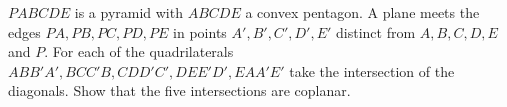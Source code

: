 $PABCDE$ is a pyramid with $ABCDE$ a convex pentagon. A plane meets the edges $PA,\allowbreak PB,\allowbreak PC,\allowbreak PD,\allowbreak PE$ in points $A',\allowbreak B',\allowbreak C',\allowbreak D',\allowbreak E'$ distinct from $A,\allowbreak B,\allowbreak C,\allowbreak D,\allowbreak E$ and $P$. For each of the quadrilaterals $ABB'A',\allowbreak BCC'B,\allowbreak CDD'C',\allowbreak DEE'D',\allowbreak EAA'E'$ take the intersection of the diagonals. Show that the five intersections are coplanar.
